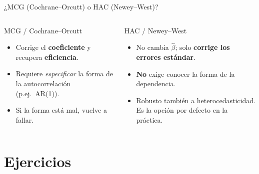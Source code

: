 \documentclass{beamer}
\begin{document}
\begin{frame}{¿MCG (Cochrane--Orcutt) o HAC (Newey--West)?}

\begin{columns}
  \begin{block}{MCG / Cochrane--Orcutt}
  \begin{itemize}
    \item Corrige el \textbf{coeficiente} y recupera \textbf{eficiencia}.
    \item Requiere \emph{especificar} la forma de la autocorrelación (p.ej.\ AR(1)).
    \item Si la forma está mal, vuelve a fallar.
  \end{itemize}
  \end{block}

  \begin{alertblock}{HAC / Newey--West}
  \begin{itemize}
    \item No cambia $\hat\beta$; solo \textbf{corrige los errores estándar}.
    \item \textbf{No} exige conocer la forma de la dependencia.
    \item Robusto también a heterocedasticidad. Es la opción por defecto en la práctica.
  \end{itemize}
  \end{alertblock}
\end{columns}

\end{frame}

\section{Ejercicios}
\end{document}

